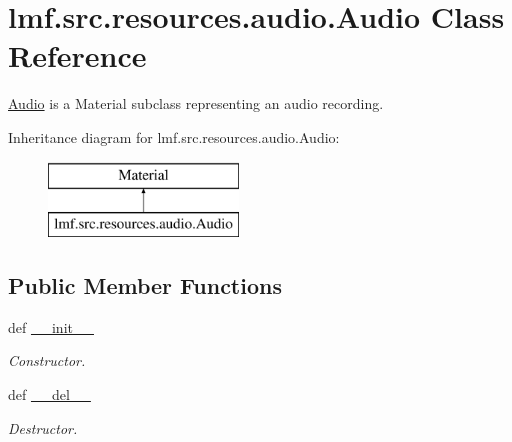 \hypertarget{classlmf_1_1src_1_1resources_1_1audio_1_1_audio}{\section{lmf.\+src.\+resources.\+audio.\+Audio Class Reference}
\label{classlmf_1_1src_1_1resources_1_1audio_1_1_audio}
}


\hyperlink{classlmf_1_1src_1_1resources_1_1audio_1_1_audio}{Audio} is a Material subclass representing an audio recording.  


Inheritance diagram for lmf.\+src.\+resources.\+audio.\+Audio\+:\begin{figure}[H]
\begin{center}
\leavevmode
\includegraphics[height=2.000000cm]{classlmf_1_1src_1_1resources_1_1audio_1_1_audio}
\end{center}
\end{figure}
\subsection*{Public Member Functions}
\begin{DoxyCompactItemize}
\item 
def \hyperlink{classlmf_1_1src_1_1resources_1_1audio_1_1_audio_ad160d4e583ac17c4825a0432d6715685}{\+\_\+\+\_\+init\+\_\+\+\_\+}
\begin{DoxyCompactList}\small\item\em Constructor. \end{DoxyCompactList}\item 
def \hyperlink{classlmf_1_1src_1_1resources_1_1audio_1_1_audio_af6706b4ce77d04e2c5d450b83d9586ae}{\+\_\+\+\_\+del\+\_\+\+\_\+}
\begin{DoxyCompactList}\small\item\em Destructor. \end{DoxyCompactList}\end{DoxyCompactItemize}
